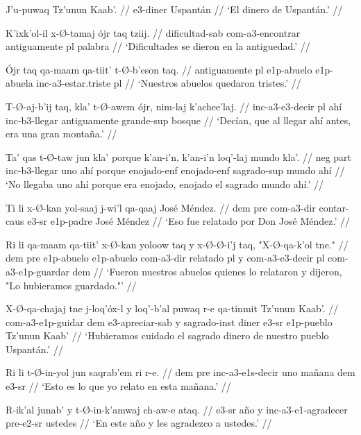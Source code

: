 \documentclass[12pt]{article}
\begin{document}
\ex
\begingl
  \gla  J'u-puwaq Tz'unun Kaab'. //
  \glb e3-diner Uspant\'an //
  \glft `El dinero de Uspant\'an.' //
\endgl
\xe

\ex
\begingl
  \gla  K'ixk'ol-il x-\O-tamaj \'ojr taq tziij. //
  \glb  dificultad-sab com-a3-encontrar antiguamente pl palabra //
  \glft `Dificultades se dieron en la antiguedad.' //
\endgl
\xe

\ex
\begingl
  \gla \'Ojr taq qa-maam qa-tiit' t-\O-b'eson taq. //
  \glb antiguamente pl e1p-abuelo e1p-abuela inc-a3-estar.triste pl //
  \glft `Nuestros abuelos quedaron tristes.' //
\endgl
\xe


\ex
\begingl
  \gla T-\O-aj-b'ij taq, kla' t-\O-awem \'ojr, nim-laj k'achee'laj. //
  \glb inc-a3-e3-decir pl ah\'i inc-b3-llegar antiguamente grande-sup bosque //
  \glft `Dec\'ian, que al llegar ah\'i antes, era una gran monta\~na.' //
\endgl
\xe

\ex
\begingl
  \gla Ta' qas t-\O-taw jun kla' porque k'an-i'n, k'an-i'n loq'-laj mundo kla'. //
  \glb neg part inc-b3-llegar uno ah\'i porque enojado-enf enojado-enf sagrado-sup mundo ah\'i //
  \glft `No llegaba uno ah\'i porque era enojado, enojado el sagrado mundo ah\'i.' //
\endgl
\xe

\ex
\begingl
  \gla  Ti li x-\O-kan yol-saaj j-wi'l qa-qaaj Jos\'e M\'endez. //
  \glb dem pre com-a3-dir contar-caus e3-sr e1p-padre Jos\'e M\'endez //
  \glft `Eso fue relatado por Don Jos\'e M\'endez.' //
\endgl
\xe

\ex
\begingl
  \gla  Ri li qa-maam qa-tiit' x-\O-kan yoloow taq y x-\O-\O-i'j taq, "X-\O-qa-k'ol tne." //
  \glb  dem pre e1p-abuelo e1p-abuelo com-a3-dir relatado pl y com-a3-e3-decir pl com-a3-e1p-guardar dem //
  \glft `Fueron nuestros abuelos quienes lo relataron y dijeron, "Lo hubieramos guardado."' //
\endgl
\xe

\ex
\begingl
  \gla  X-\O-qa-chajaj tne j-loq'\'ox-l y loq'-b'al puwaq r-e qa-tinmit Tz'unun Kaab'. //
  \glb com-a3-e1p-guidar dem e3-apreciar-sab y sagrado-inst diner e3-sr e1p-pueblo Tz'unun Kaab' //
  \glft `Hubieramos cuidado el sagrado dinero de nuestro pueblo Uspant\'an.' //
\endgl
\xe

\ex
\begingl
  \gla  Ri li t-\O-in-yol jun saqrab'em ri r-e. //
  \glb dem pre inc-a3-e1s-decir uno ma\~nana dem e3-sr //
  \glft `Esto es lo que yo relato en esta ma\~nana.' //
\endgl
\xe

\ex
\begingl
  \gla  R-ik'al junab' y t-\O-in-k'amwaj ch-aw-e ataq. //
  \glb  e3-sr a\~no y inc-a3-e1-agradecer pre-e2-sr ustedes //
  \glft `En este a\~no y les agradezco a ustedes.' //
\endgl
\xe
\end{document}
